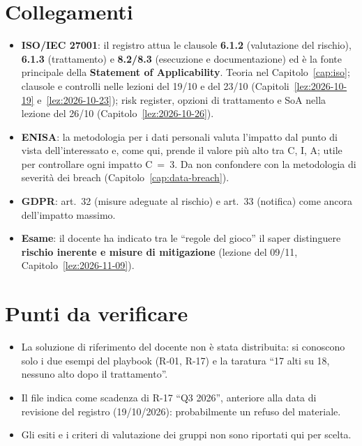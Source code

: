 \section{Collegamenti}
\begin{itemize}
  \item \textbf{ISO/IEC 27001}: il registro attua le clausole \textbf{6.1.2} (valutazione del rischio),
    \textbf{6.1.3} (trattamento) e \textbf{8.2/8.3} (esecuzione e documentazione) ed è la fonte principale
    della \textbf{Statement of Applicability}. Teoria nel Capitolo~\ref{cap:iso}; clausole e controlli
    nelle lezioni del 19/10 e del 23/10 (Capitoli~\ref{lez:2026-10-19} e~\ref{lez:2026-10-23}); risk
    register, opzioni di trattamento e SoA nella lezione del 26/10 (Capitolo~\ref{lez:2026-10-26}).
  \item \textbf{ENISA}: la metodologia per i dati personali valuta l'impatto dal punto di vista
    dell'interessato e, come qui, prende il valore più alto tra C, I, A; utile per controllare ogni impatto
    C~=~3. Da non confondere con la metodologia di severità dei breach (Capitolo~\ref{cap:data-breach}).
  \item \textbf{GDPR}: art.~32 (misure adeguate al rischio) e art.~33 (notifica) come ancora dell'impatto
    massimo.
  \item \textbf{Esame}: il docente ha indicato tra le ``regole del gioco'' il saper distinguere
    \textbf{rischio inerente e misure di mitigazione} (lezione del 09/11, Capitolo~\ref{lez:2026-11-09}).
\end{itemize}

\section{Punti da verificare}
\begin{verifica}
\begin{itemize}
  \item La soluzione di riferimento del docente non è stata distribuita: si conoscono solo i due esempi del
    playbook (R-01, R-17) e la taratura ``17 alti su 18, nessuno alto dopo il trattamento''.
  \item Il file indica come scadenza di R-17 ``Q3 2026'', anteriore alla data di revisione del registro
    (19/10/2026): probabilmente un refuso del materiale.
  \item Gli esiti e i criteri di valutazione dei gruppi non sono riportati qui per scelta.
\end{itemize}
\end{verifica}
